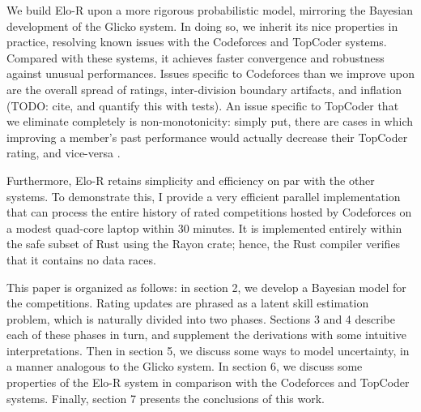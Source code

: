 We build Elo-R upon a more rigorous probabilistic model, mirroring the Bayesian development of the Glicko system. In doing so, we inherit its nice properties in practice, resolving known issues with the Codeforces and TopCoder systems. Compared with these systems, it achieves faster convergence and robustness against unusual performances. Issues specific to Codeforces than we improve upon are the overall spread of ratings, inter-division boundary artifacts, and inflation (TODO: cite, and quantify this with tests). An issue specific to TopCoder that we eliminate completely is non-monotonicity: simply put, there are cases in which improving a member's past performance would actually decrease their TopCoder rating, and vice-versa \cite{forivsektheoretical}.

Furthermore, Elo-R retains simplicity and efficiency on par with the other systems. To demonstrate this, I provide a very efficient parallel implementation that can process the entire history of rated competitions hosted by Codeforces on a modest quad-core laptop within 30 minutes. It is implemented entirely within the safe subset of Rust using the Rayon crate; hence, the Rust compiler verifies that it contains no data races.

This paper is organized as follows: in section 2, we develop a Bayesian model for the competitions. Rating updates are phrased as a latent skill estimation problem, which is naturally divided into two phases. Sections 3 and 4 describe each of these phases in turn, and supplement the derivations with some intuitive interpretations. Then in section 5, we discuss some ways to model uncertainty, in a manner analogous to the Glicko system. In section 6, we discuss some properties of the Elo-R system in comparison with the Codeforces and TopCoder systems. Finally, section 7 presents the conclusions of this work.
